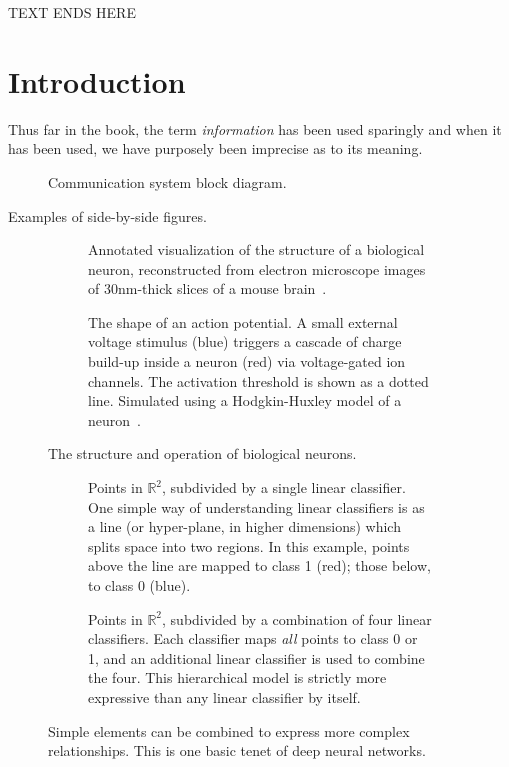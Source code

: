 TEXT ENDS HERE


\section{Introduction}

Thus far in the book, the term \textit{information}
%
has been used sparingly and when
it has been used, we have purposely been imprecise as to its meaning.



\begin{figure}[hbt] %
\centering
  \figboxes
\caption{Communication system block diagram.}
\label{ch01.fig2} 
\end{figure}

Examples of side-by-side figures.

\begin{figure}[hbt]%
\centering
\begin{subfigure}[t]{0.45\textwidth}%
	\smfigboxes
\caption{Annotated visualization of the structure of a biological neuron, reconstructed from electron microscope images of 30nm-thick slices of a mouse 
brain~\cite{tesniere59}.}%
\label{fig:bioneuron}%
\end{subfigure}%
\qquad%
\begin{subfigure}[t]{0.45\textwidth}%
	\smfigboxes
\caption{The shape of an action potential. A small external voltage stimulus (blue) triggers a cascade of charge build-up inside a neuron (red) via voltage-gated ion channels. The activation threshold is shown as a dotted line. Simulated using a Hodgkin-Huxley model of a neuron~\protect\cite{weber-97}.}%
\label{fig:ap}%
\end{subfigure}%
\caption{The structure and operation of biological neurons.}%
\end{figure}

\begin{figure}[b]
\centering
\begin{subfigure}[t]{0.45\textwidth}
	\smfigboxes
\caption{Points in $\mathbb{R}^2$, subdivided by a single linear classifier. One simple way of understanding linear classifiers is as a line (or hyper-plane, in higher dimensions) which splits space into two regions. In this example, points above the line are mapped to class 1 (red); those below, to class 0 (blue).}
\label{subfig:linclass}
\end{subfigure}%
\qquad%
\begin{subfigure}[t]{0.45\textwidth}
	\smfigboxes
\caption{Points in $\mathbb{R}^2$, subdivided by a combination of four linear classifiers. Each classifier maps \emph{all} points to class 0 or 1, and an additional linear classifier is used to combine the four. This hierarchical model is strictly more expressive than any linear classifier by itself.}
\label{subfig:circclass}
\end{subfigure}%
\caption{Simple elements can be combined to express more complex relationships.
This is one basic tenet of deep neural networks.}
\label{fig:classifiers}
\end{figure}


